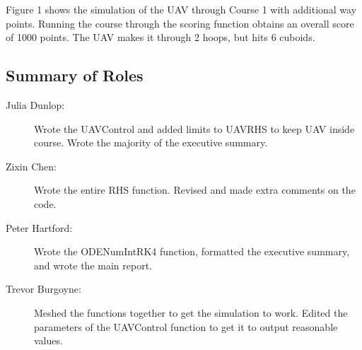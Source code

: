 \documentclass[12pt]{article}
\begin{document}
Figure 1 shows the simulation of the UAV through Course 1 with additional way points. Running the course through the scoring function obtains an overall score of 1000 points. The UAV makes it through 2 hoops, but hits 6 cuboids. 	




\pagebreak
\subsection*{Summary of Roles}  

\begin{description}
\item[Julia Dunlop:] Wrote the UAVControl and added limits to UAVRHS to keep UAV inside course. Wrote the majority of the executive summary. 

\item[Zixin Chen:] Wrote the entire RHS function. Revised and made extra comments on the code.

\item[Peter Hartford:] Wrote the ODENumIntRK4 function, formatted the executive summary, and wrote the main report. 

\item[Trevor Burgoyne:] Meshed the functions together to get the simulation to work. Edited the parameters of the UAVControl function to get it to output reasonable values.

\end{description}

\pagebreak  
\end{document}
